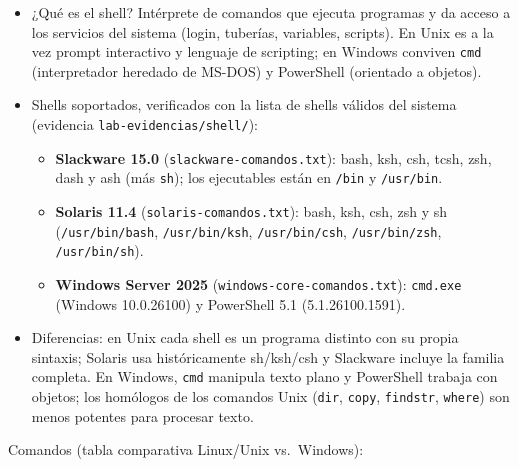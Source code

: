 \documentclass[11pt,a4paper]{report}
\begin{document}
\begin{itemize}
  \item ¿Qué es el shell? Intérprete de comandos que ejecuta programas y da acceso a los servicios del sistema (login, tuberías, variables, scripts). En Unix es a la vez prompt interactivo y lenguaje de scripting; en Windows conviven \texttt{cmd} (interpretador heredado de MS-DOS) y PowerShell (orientado a objetos).
  \item Shells soportados, verificados con la lista de shells válidos del sistema (evidencia \texttt{lab-evidencias/shell/}):
    \begin{itemize}
      \item \textbf{Slackware 15.0} (\texttt{slackware-comandos.txt}): bash, ksh, csh, tcsh, zsh, dash y ash (más \texttt{sh}); los ejecutables están en \texttt{/bin} y \texttt{/usr/bin}.
      \item \textbf{Solaris 11.4} (\texttt{solaris-comandos.txt}): bash, ksh, csh, zsh y sh (\texttt{/usr/bin/bash}, \texttt{/usr/bin/ksh}, \texttt{/usr/bin/csh}, \texttt{/usr/bin/zsh}, \texttt{/usr/bin/sh}).
      \item \textbf{Windows Server 2025} (\texttt{windows-core-comandos.txt}): \texttt{cmd.exe} (Windows 10.0.26100) y PowerShell 5.1 (5.1.26100.1591).
    \end{itemize}
  \item Diferencias: en Unix cada shell es un programa distinto con su propia sintaxis; Solaris usa históricamente sh/ksh/csh y Slackware incluye la familia completa. En Windows, \texttt{cmd} manipula texto plano y PowerShell trabaja con objetos; los homólogos de los comandos Unix (\texttt{dir}, \texttt{copy}, \texttt{findstr}, \texttt{where}) son menos potentes para procesar texto.
\end{itemize}

Comandos (tabla comparativa Linux/Unix vs.\ Windows):
\end{document}
